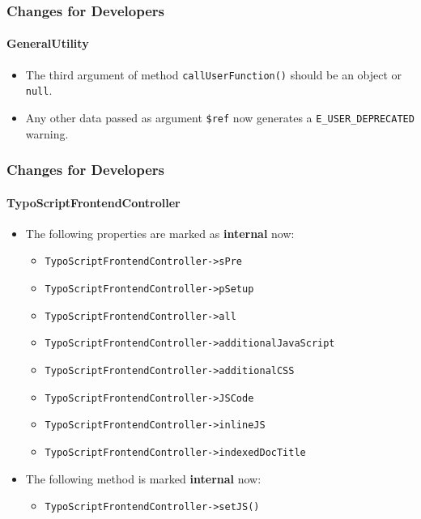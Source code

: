 \begin{frame}[fragile]
	\frametitle{Changes for Developers}
	\framesubtitle{GeneralUtility}

	\begin{itemize}
		\item The third argument of method \texttt{callUserFunction()}
			should be an object or \texttt{null}.
		\item Any other data passed as argument \texttt{\$ref} now generates
			a \texttt{E\_USER\_DEPRECATED} warning.
	\end{itemize}

\end{frame}


\begin{frame}[fragile]
	\frametitle{Changes for Developers}
	\framesubtitle{TypoScriptFrontendController}

	\begin{itemize}
		\item The following properties are marked as \textbf{internal} now:
			\begin{itemize}
				\item \texttt{TypoScriptFrontendController->sPre}
				\item \texttt{TypoScriptFrontendController->pSetup}
				\item \texttt{TypoScriptFrontendController->all}
				\item \texttt{TypoScriptFrontendController->additionalJavaScript}
				\item \texttt{TypoScriptFrontendController->additionalCSS}
				\item \texttt{TypoScriptFrontendController->JSCode}
				\item \texttt{TypoScriptFrontendController->inlineJS}
				\item \texttt{TypoScriptFrontendController->indexedDocTitle}
			\end{itemize}

		\item The following method is marked \textbf{internal} now:

			\begin{itemize}
				\item \texttt{TypoScriptFrontendController->setJS()}
			\end{itemize}

	\end{itemize}

\end{frame}


